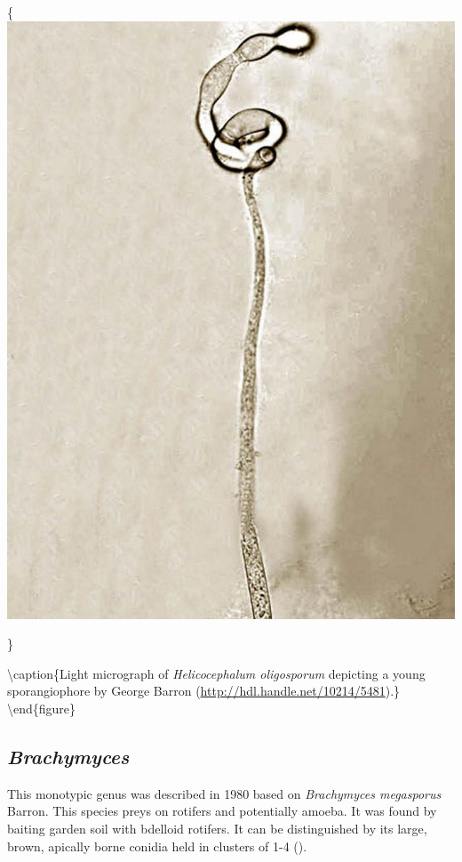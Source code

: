 \documentclass[]{book}
\begin{document}
\{\centering \includegraphics{img/Ch3_Fig8}

\}

\textbackslash caption\{Light micrograph of \emph{Helicocephalum oligosporum} depicting a young sporangiophore by George Barron (\url{http://hdl.handle.net/10214/5481}).\}\label{fig:ch3fig8}
\textbackslash end\{figure\}

\hypertarget{brachymyces}{%
\subsection{\texorpdfstring{\emph{Brachymyces}}{Brachymyces}}\label{brachymyces}}

This monotypic genus was described in 1980 based on \emph{Brachymyces megasporus} Barron. This species preys on rotifers and potentially amoeba. It was found by baiting garden soil with bdelloid rotifers. It can be distinguished by its large, brown, apically borne conidia held in clusters of 1-4 (\citet{Barron_1980}).
\end{document}
